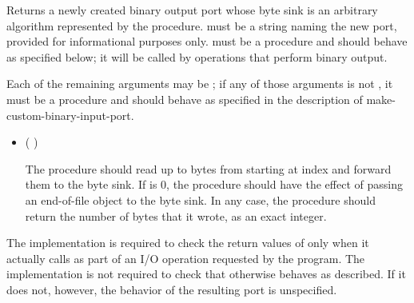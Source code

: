 \begin{entry}{%
}

Returns a newly created binary output port whose byte sink is
an arbitrary algorithm represented by the  procedure.
 must be a string naming the new port,
provided for informational purposes only.
 must be a procedure and should behave as specified
below; it will be called by operations that perform binary output.

Each of the remaining arguments may be \schfalse{}; if any of
those arguments is not \schfalse{}, it must be a procedure and
should behave as specified in the description of
{\cf make-custom-binary-input-port}.
   
\begin{itemize}
\item {\cf (   )}
       
  The  procedure should read up to  bytes
  from  starting at index  and forward
  them to the byte sink.
  If  is 0, the  procedure should
  have the effect of passing an end-of-file object to the byte sink.
  In any case, the  procedure should return the number of
  bytes that it wrote, as an exact integer.
\end{itemize}

\implresp The implementation is required to check the return
values of  only when it actually calls  as part of
an I/O operation requested by the program.  The implementation is not
required to check that  otherwise behaves as described.
If it does not, however, the behavior of the resulting port is
unspecified.
\end{entry}

